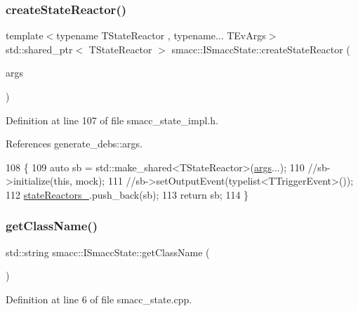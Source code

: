 \subsubsection{\texorpdfstring{create\+State\+Reactor()}{createStateReactor()}\hspace{0.1cm}{\footnotesize\ttfamily [2/2]}}
{\footnotesize\ttfamily template$<$typename T\+State\+Reactor , typename... T\+Ev\+Args$>$ \\
std\+::shared\+\_\+ptr$<$ T\+State\+Reactor $>$ smacc\+::\+I\+Smacc\+State\+::create\+State\+Reactor (\begin{DoxyParamCaption}\item[{T\+Ev\+Args...}]{args }\end{DoxyParamCaption})}



Definition at line 107 of file smacc\+\_\+state\+\_\+impl.\+h.



References generate\+\_\+debs\+::args.


\begin{DoxyCode}
108 \{
109     \textcolor{keyword}{auto} sb = std::make\_shared<TStateReactor>(\hyperlink{namespacegenerate__debs_a75f9143e38df82d83b2e8a6f99cae02c}{args}...);
110     \textcolor{comment}{//sb->initialize(this, mock);}
111     \textcolor{comment}{//sb->setOutputEvent(typelist<TTriggerEvent>());}
112     \hyperlink{classsmacc_1_1ISmaccState_a7410a353b515f7b7357e94ef619a6c45}{stateReactors\_}.push\_back(sb);
113     \textcolor{keywordflow}{return} sb;
114 \}
\end{DoxyCode}
\mbox{\label{classsmacc_1_1ISmaccState_a5bf0b49d5ea6b9e8f45c26fa155b2664}} 
\subsubsection{\texorpdfstring{get\+Class\+Name()}{getClassName()}}
{\footnotesize\ttfamily std\+::string smacc\+::\+I\+Smacc\+State\+::get\+Class\+Name (\begin{DoxyParamCaption}{ }\end{DoxyParamCaption})\hspace{0.3cm}{\ttfamily [virtual]}}



Definition at line 6 of file smacc\+\_\+state.\+cpp.



